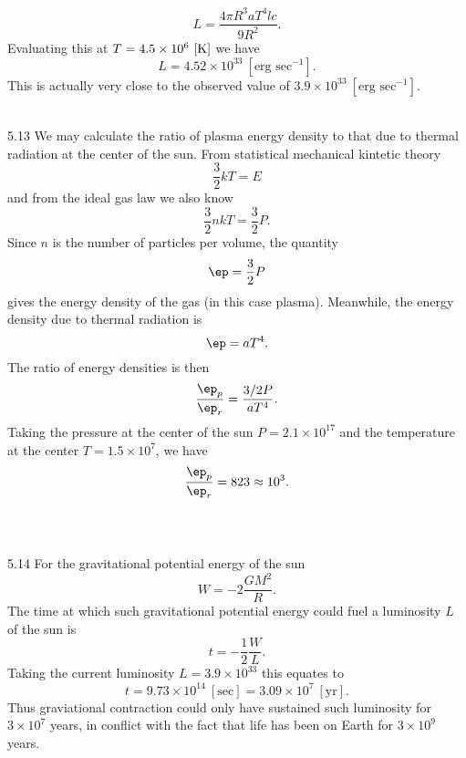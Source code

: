 \documentclass[10pt,letterpaper]{article}
\begin{document}
\[
	L = \frac{4\pi R^3 a T^4 lc}{9 R^2} .
\]
Evaluating this at $T = 4.5\times 10^6\ [\text K]$ we have
\[
	L = 4.52 \times 10^{33}\ [\text{erg sec}^{-1}].
\]
This is actually very close to the observed value of $3.9 \times 10^{33}\ [\text{erg sec}^{-1}]$. \\ \\
\item[5.13]
We may calculate the ratio of plasma energy density to that due to thermal radiation at the center of the sun. From statistical mechanical kintetic theory
\[
	\frac{3}{2}kT = E
\]
and from the ideal gas law we also know
\[
	\frac32 nkT = \frac32 P.
\]
Since $n$ is the number of particles per volume, the quantity
\[
	\ep = \frac32 P
\]
gives the energy density of the gas (in this case plasma). Meanwhile, the energy density due to thermal radiation is
\[
	\ep =aT^4.
\]
The ratio of energy densities is then
\[
	\frac{\ep_p}{\ep_r} = \frac{3/2 P}{aT^4}.
\]
Taking the pressure at the center of the sun $P= 2.1\times 10^{17}$ and the temperature at the center $T = 1.5\times 10^7$, we have
\[
	\frac{\ep_p}{\ep_r} = 823 \approx 10^3.
\]
\\ \\
\item[5.14]
For the gravitational potential energy of the sun
\[
	W = -2\frac{GM^2}{R}.
\]
The time at which such gravitational potential energy could fuel a luminosity $L$ of the sun is
\[
	t = -\frac12 \frac{W}{L}.
\]
Taking the current luminosity $L = 3.9\times 10^{33}$ this equates to
\[
	t = 9.73\times 10^{14}\ [\text{sec}]  = 3.09\times 10^7 \ [\text{yr}].
\]
Thus graviational contraction could only have sustained such luminosity for $3\times 10^7$ years, in conflict with the fact that life has been on Earth for $3\times 10^9$ years. 
\eenum
\end{document}
